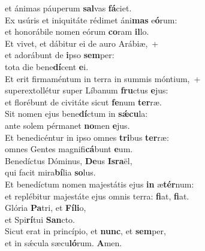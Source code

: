 \oddverse et ánimas páuperum \textbf{sal}vas \textbf{fá}ciet.\\
\evenverse Ex usúris et iniquitáte rédimet áni\textbf{mas} e\textbf{ó}rum:~\*\\
\evenverse et honorábile nomen eórum \textbf{co}ram \textbf{il}lo.\\
\oddverse Et vivet, et dábitur ei de auro Arábiæ,~+\\
\oddverse  et adorábunt de \textbf{i}pso \textbf{sem}per:~\*\\
\oddverse tota die bene\textbf{dí}cent \textbf{e}i.\\
\evenverse Et erit firmaméntum in terra in summis móntium,~+\\
\evenverse  superextollétur super Líbanum \textbf{fru}ctus \textbf{e}jus:~\*\\
\evenverse et florébunt de civitáte sicut \textbf{fe}num \textbf{ter}ræ.\\
\oddverse Sit nomen ejus bene\textbf{dí}ctum in \textbf{sǽ}\textbf{cu}la:~\*\\
\oddverse ante solem pérmanet \textbf{no}men \textbf{e}jus.\\
\evenverse Et benedicéntur in ipso omnes \textbf{tri}bus \textbf{ter}ræ:~\*\\
\evenverse omnes Gentes magnifi\textbf{cá}bunt \textbf{e}um.\\
\oddverse Benedíctus Dóminus, \textbf{De}us \textbf{Is}\textbf{ra}ël,~\*\\
\oddverse qui facit mira\textbf{bí}lia \textbf{so}lus.\\
\evenverse Et benedíctum nomen majestátis ejus \textbf{in} æ\textbf{tér}num:~\*\\
\evenverse et replébitur majestáte ejus omnis terra: \textbf{fi}at, \textbf{fi}at.\\
\oddverse Glória \textbf{Pa}tri, et \textbf{Fí}\textbf{li}o,~\*\\
\oddverse et Spi\textbf{rí}tui \textbf{San}cto.\\
\evenverse Sicut erat in princípio, et \textbf{nunc}, et \textbf{sem}per,~\*\\
\evenverse et in sǽcula sæcu\textbf{ló}rum. \textbf{A}men.\\
